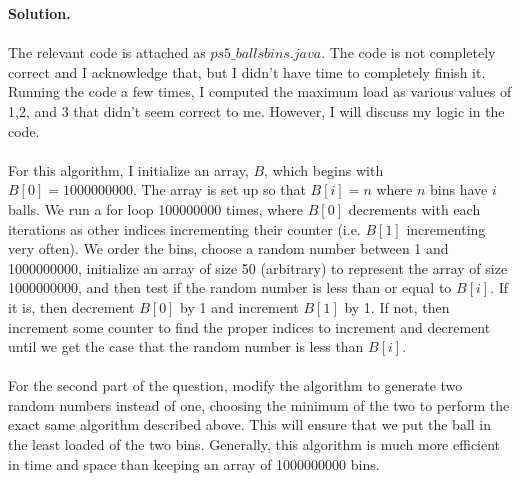 \documentclass[11pt]{article}
\newcommand\solution{%
  \textbf{Solution.}\\%
}
\begin{document}
\begin{enumerate}
\solution \\
The relevant code is attached as $ps5\_ballsbins.java$. The code is not completely correct and I acknowledge that, but I didn't have time to completely finish it. Running the code a few times, I computed the maximum load as various values of 1,2, and 3 that didn't seem correct to me. However, I will discuss my logic in the code. \\
\\
For this algorithm, I initialize an array, $B$, which begins with $B[0] = 1000000000$. The array is set up so that $B[i] = n$ where $n$ bins have $i$ balls. We run a for loop 100000000 times, where $B[0]$ decrements with each iterations as other indices incrementing their counter (i.e. $B[1]$ incrementing very often). We order the bins, choose a random number between 1 and 1000000000, initialize an array of size 50 (arbitrary) to represent the array of size 1000000000, and then test if the random number is less than or equal to $B[i]$. If it is, then decrement $B[0]$ by 1 and increment $B[1]$ by 1. If not, then increment some counter to find the proper indices to increment and decrement until we get the case that the random number is less than $B[i]$. \\
\\
For the second part of the question, modify the algorithm to generate two random numbers instead of one, choosing the minimum of the two to perform the exact same algorithm described above. This will ensure that we put the ball in the least loaded of the two bins. Generally, this algorithm is much more efficient in time and space than keeping an array of 1000000000 bins. 



\end{enumerate}
\end{document}

